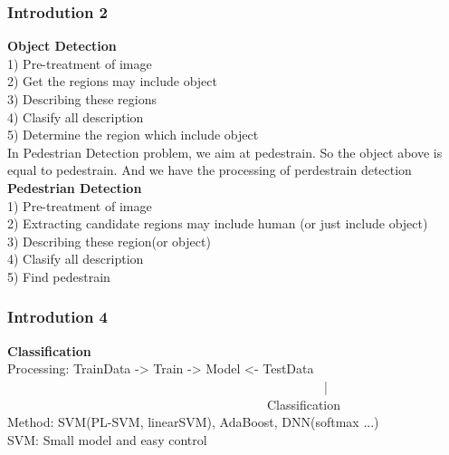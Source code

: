 \documentclass{beamer}
\begin{document}
\begin{frame}
\frametitle{Introdution 2}
\textbf{Object Detection}
\\1) Pre-treatment of image
\\2) Get the regions may include object
\\3) Describing these regions
\\4) Clasify all description
\\5) Determine the region which include object
\\[2ex]
In Pedestrian Detection problem, we aim at pedestrain. So the object above is equal to pedestrain. And we have the processing of perdestrain detection
\\[2ex]
\textbf{Pedestrian Detection}
\\1) Pre-treatment of image
\\2) Extracting candidate regions may include human (or just include object)
\\3) Describing these region(or object)
\\4) Clasify all description
\\5) Find pedestrain
\end{frame}






\begin{frame}
\frametitle{Introdution 4}
\textbf{Classification}
\\Processing:  TrainData -> Train -> Model <- TestData\\
\ \ \ \ \ \ \ \ \ \ \ \ \ \ \ \ \ \ \ \ \ \ \ \ \ \ \ \ \ \ \ \ \ \ \ \ \ \ \ \ \ \ \ \ \ \ \ \ \ \ |\\
\ \ \ \ \ \ \ \ \ \ \ \ \ \ \ \ \ \ \ \ \ \ \ \ \ \ \ \ \ \ \ \ \ \ \ \ \ \ \ \ \ Classification
\\Method: SVM(PL-SVM, linearSVM), AdaBoost, DNN(softmax ...)
\\SVM: Small model and easy control
\end{frame}
\end{document}
